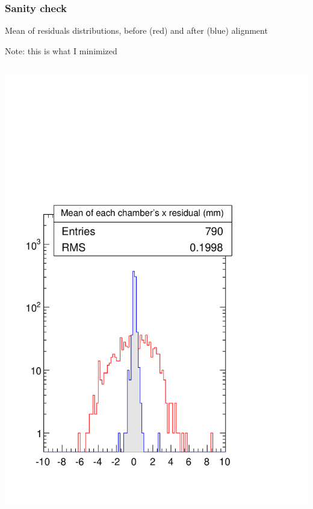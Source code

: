 \documentclass[compress]{beamer}
\begin{document}
\begin{frame}
\frametitle{Sanity check}
\small

Mean of residuals distributions, before (red) and after (blue) alignment

\vfill
Note: this is what I minimized

\vfill
\begin{columns}
\includegraphics[width=\linewidth]{S156_plots/sanitycheck_x.pdf}

\end{columns}
\end{frame}
\end{document}

